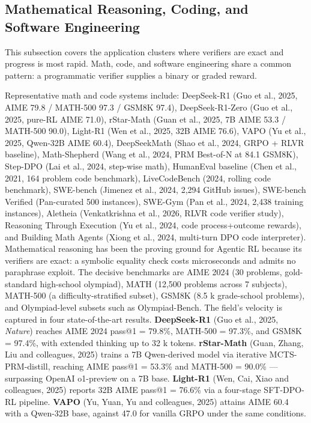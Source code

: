 \subsection{Mathematical Reasoning, Coding, and Software Engineering}\label{mathematical-reasoning-coding-and-software-engineering}

This subsection covers the application clusters where verifiers are exact and progress is most rapid. Math, code, and software engineering share a common pattern: a programmatic verifier supplies a binary or graded reward.

Representative math and code systems include: DeepSeek-R1 (Guo et al., 2025, AIME 79.8 / MATH-500 97.3 / GSM8K 97.4), DeepSeek-R1-Zero (Guo et al., 2025, pure-RL AIME 71.0), rStar-Math (Guan et al., 2025, 7B AIME 53.3 / MATH-500 90.0), Light-R1 (Wen et al., 2025, 32B AIME 76.6), VAPO (Yu et al., 2025, Qwen-32B AIME 60.4), DeepSeekMath (Shao et al., 2024, GRPO + RLVR baseline), Math-Shepherd (Wang et al., 2024, PRM Best-of-N at 84.1 GSM8K), Step-DPO (Lai et al., 2024, step-wise math), HumanEval baseline (Chen et al., 2021, 164 problem code benchmark), LiveCodeBench (2024, rolling code benchmark), SWE-bench (Jimenez et al., 2024, 2,294 GitHub issues), SWE-bench Verified (Pan-curated 500 instances), SWE-Gym (Pan et al., 2024, 2,438 training instances), Aletheia (Venkatkrishna et al., 2026, RLVR code verifier study), Reasoning Through Execution (Yu et al., 2024, code process+outcome rewards), and Building Math Agents (Xiong et al., 2024, multi-turn DPO code interpreter). Mathematical reasoning has been the proving ground for Agentic RL because its verifiers are exact: a symbolic equality check costs microseconds and admits no paraphrase exploit. The decisive benchmarks are AIME 2024 (30 problems, gold-standard high-school olympiad), MATH (12,500 problems across 7 subjects), MATH-500 (a difficulty-stratified subset), GSM8K (8.5 k grade-school problems), and Olympiad-level subsets such as Olympiad-Bench. The field's velocity is captured in four state-of-the-art results. \textbf{DeepSeek-R1} (Guo et al., 2025, \emph{Nature}) reaches AIME 2024 pass@1 = 79.8\%, MATH-500 = 97.3\%, and GSM8K = 97.4\%, with extended thinking up to 32 k tokens. \textbf{rStar-Math} (Guan, Zhang, Liu and colleagues, 2025) trains a 7B Qwen-derived model via iterative MCTS-PRM-distill, reaching AIME pass@1 = 53.3\% and MATH-500 = 90.0\% --- surpassing OpenAI o1-preview on a 7B base. \textbf{Light-R1} (Wen, Cai, Xiao and colleagues, 2025) reports 32B AIME pass@1 = 76.6\% via a four-stage SFT-DPO-RL pipeline. \textbf{VAPO} (Yu, Yuan, Yu and colleagues, 2025) attains AIME 60.4 with a Qwen-32B base, against 47.0 for vanilla GRPO under the same conditions.


